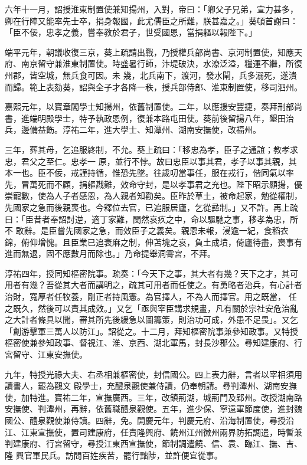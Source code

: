 \begin{pinyinscope}
 六年十一月，詔授淮東制置使兼知揚州，入對，帝曰：「卿父子兄弟，宣力甚多，卿在行陣又能率先士卒，捐身報國，此尤儒臣之所難，朕甚嘉之。」葵頓首謝曰：「臣不佞，忠孝之義，嘗奉教於君子，世受國恩，當捐軀以報陛下。」



 端平元年，朝議收復三京，葵上疏請出戰，乃授權兵部尚書、京河制置使，知應天府、南京留守兼淮東制置使。時盛暑行師，汴堤破決，水潦泛溢，糧運不繼，所復州郡，皆空城，無兵食可因。未
 幾，北兵南下，渡河，發水閘，兵多溺死，遂潰而歸。範上表劾葵，詔與全子才各降一秩，授兵部侍郎、淮東制置使，移司泗州。



 嘉熙元年，以寶章閣學士知揚州，依舊制置使。二年，以應援安豐捷，奏拜刑部尚書，進端明殿學士，特予執政恩例，復兼本路屯田使。葵前後留揚八年，墾田治兵，邊備益飭。淳祐二年，進大學士、知潭州、湖南安撫使，改福州。



 三年，葬其母，乞追服終制，不允。葵上疏曰：「移忠為孝，臣子之通誼；教孝求忠，君父之至仁。忠孝一
 原，並行不悖。故曰忠臣以事其君，孝子以事其親，其本一也。臣不佞，戒謹持循，惟恐先墜。往歲叨當事任，服在戎行，偕同氣以率先，冒萬死而不顧，捐軀戡難，效命守封，是以孝事君之充也。陛下昭示顯揚，優崇寵數，使為人子者感恩，為人親者知勸矣。臣昨於草土，被命起家，勉從權制，先國家之急而後親喪也。今釋位去官，已追服居廬，乞從彞制。」又不許。再上疏曰：「臣昔者奉詔討逆，適丁家難，閔然哀疚之中，命以驅馳之事，移孝為忠，所不
 敢辭。是臣嘗先國家之急，而效臣子之義矣。親恩未報，浸逾一紀，食稻衣錦，俯仰增愧。且臣業已追衰麻之制，伸苫塊之哀，負土成墳，倚廬待盡，喪事有進而無退，固不應數月而除也。」乃命提舉洞霄宮，不拜。



 淳祐四年，授同知樞密院事。疏奏：「今天下之事，其大者有幾？天下之才，其可用者有幾？吾從其大者而講明之，疏其可用者而任使之。有勇略者治兵，有心計者治財，寬厚者任牧養，剛正者持風憲。為官擇人，不為人而擇官。用之既當，
 任之既久，然後可以責其成效。」又乞「亟與宰臣講求規畫，凡有關於宗社安危治亂之大計者條具以聞，審其所先後緩急以圖籌策，則治功可成，外患不足畏」。又乞「創游擊軍三萬人以防江」。詔從之。十二月，拜知樞密院事兼參知政事。又特授樞密使兼參知政事、督視江、淮、京西、湖北軍馬，封長沙郡公。尋知建康府、行宮留守、江東安撫使。



 九年，特授光祿大夫、右丞相兼樞密使，封信國公。四上表力辭，言者以宰相須用讀書人，罷為觀文
 殿學士，充醴泉觀使兼侍讀，仍奉朝請。尋判潭州、湖南安撫使，加特進。寶祐二年，宣撫廣西。三年，改鎮荊湖，城荊門及郢州。改授湖南路安撫使、判潭州，再辭，依舊職醴泉觀使。五年，進少保、寧遠軍節度使，進封魏國公、醴泉觀使兼侍讀。四辭，免。開慶元年，判慶元府、沿海制置使，尋授沿江、江東宣撫使，置司建康府，任責隆興府、饒州江州徽州兩界防拓調遣，時暫兼判建康府、行宮留守，尋授江東西宣撫使，節制調遣饒、信、袁、臨江、撫、吉、隆
 興官軍民兵。訪問百姓疾苦，罷行黜陟，並許便宜從事。




\end{pinyinscope}
